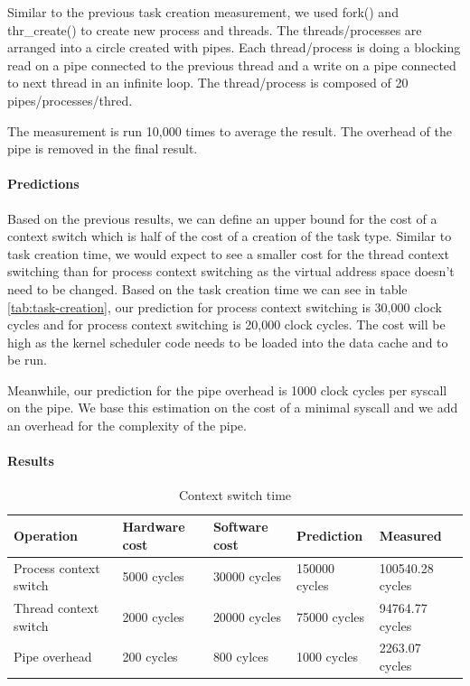 Similar to the previous task creation measurement, we used fork() and
thr\_create() to create new process and threads.
The threads/processes are arranged into a circle created with pipes.
Each thread/process is doing a blocking read on a pipe connected to the previous
thread and a write on a pipe connected to next thread in an infinite loop.
The thread/process is composed of 20 pipes/processes/thred.

The measurement is run 10,000 times to average the result.
The overhead of the pipe is removed in the final result.

\paragraph{Predictions}
Based on the previous results, we can define an upper bound for the cost of a
context switch which is half of the cost of a creation of the task type.
Similar to task creation time, we would expect to see a smaller cost
for the thread context switching than for process context switching as the virtual
address space doesn't need to be changed.
Based on the task creation time we can see in table \ref{tab:task-creation},
our prediction for process context switching is 30,000 clock
cycles and for process context switching is 20,000 clock cycles.
The cost will be high as the kernel scheduler code needs to be loaded into the
data cache and to be run.


Meanwhile, our prediction for the pipe overhead is 1000 clock cycles per syscall
on the pipe.
We base this estimation on the cost of a minimal syscall and we add an overhead
for the complexity of the pipe.

\paragraph{Results}
\begin{table}
\begin{center}
\begin{tabular}{| l | l | l | l | l |}
\hline
Operation 		& Hardware cost 	& Software cost 	& Prediction 	& Measured \\ \hline
Process context switch 	& 5000 cycles	& 30000 cycles	& 150000 cycles	& 100540.28 cycles \\ \hline
Thread context switch 	& 2000 cycles	& 20000 cycles	& 75000 cycles	& 94764.77 cycles \\ \hline
Pipe overhead		& 200 cycles	& 800 cylces	& 1000 cycles	& 2263.07 cycles \\ \hline
\end{tabular}
\end{center}

\caption{Context switch time\label{tab:context-switch-time}}
\end{table}


